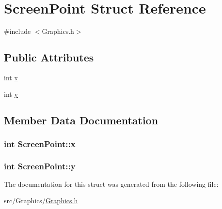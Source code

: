 \hypertarget{struct_screen_point}{}\section{Screen\+Point Struct Reference}
\label{struct_screen_point}


{\ttfamily \#include $<$Graphics.\+h$>$}

\subsection*{Public Attributes}
\begin{DoxyCompactItemize}
\item 
int \hyperlink{struct_screen_point_ada4390bf42ddde96d04420bb7dc69b8f}{x}
\item 
int \hyperlink{struct_screen_point_a61cebb2cd16030fb02ae41ee6b5c9cca}{y}
\end{DoxyCompactItemize}


\subsection{Member Data Documentation}
\subsubsection[{\texorpdfstring{x}{x}}]{\setlength{\rightskip}{0pt plus 5cm}int Screen\+Point\+::x}\hypertarget{struct_screen_point_ada4390bf42ddde96d04420bb7dc69b8f}{}\label{struct_screen_point_ada4390bf42ddde96d04420bb7dc69b8f}
\subsubsection[{\texorpdfstring{y}{y}}]{\setlength{\rightskip}{0pt plus 5cm}int Screen\+Point\+::y}\hypertarget{struct_screen_point_a61cebb2cd16030fb02ae41ee6b5c9cca}{}\label{struct_screen_point_a61cebb2cd16030fb02ae41ee6b5c9cca}


The documentation for this struct was generated from the following file\+:\begin{DoxyCompactItemize}
\item 
src/\+Graphics/\hyperlink{_graphics_8h}{Graphics.\+h}\end{DoxyCompactItemize}
